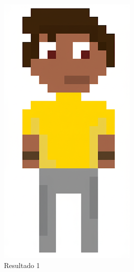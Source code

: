 \begin{figure}[htbp]
\begin{subfigure}{0.23\linewidth}
        \includegraphics[width=1\linewidth]{figs/geminiPro/chat2/res1_tela8.PNG}
        \caption{\small Resultado 1}
        \label{fig:geminiPro7a}
    \end{subfigure}
    \begin{subfigure}{0.23\linewidth}

\end{subfigure}
\end{figure}
